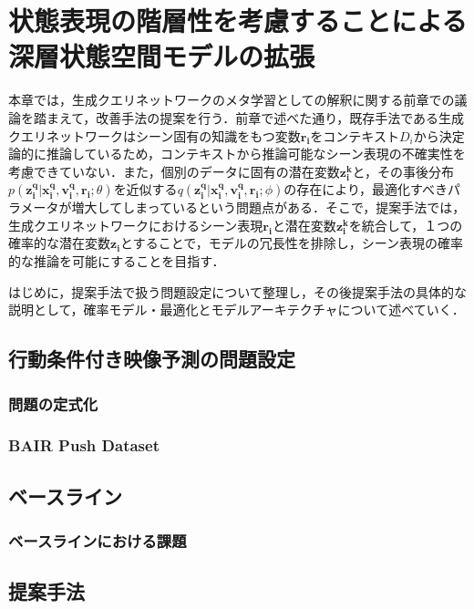 \chapter{状態表現の階層性を考慮することによる深層状態空間モデルの拡張}
\label{chap:proposal}
本章では，生成クエリネットワークのメタ学習としての解釈に関する前章での議論を踏まえて，改善手法の提案を行う．前章で述べた通り，既存手法である生成クエリネットワークはシーン固有の知識をもつ変数$\bm{r_i}$をコンテキスト$D_i$から決定論的に推論しているため，コンテキストから推論可能なシーン表現の不確実性を考慮できていない．また，個別のデータに固有の潜在変数$\bm{z_i^k}$と，その事後分布$p(\bm{z_i^q}|\bm{x_i^q}, \bm{v_i^q}, \bm{r_i}; \theta)$を近似する$q(\bm{z_i^q}|\bm{x_i^q}, \bm{v_i^q}, \bm{r_i}; \phi)$の存在により，最適化すべきパラメータが増大してしまっているという問題点がある．そこで，提案手法では，生成クエリネットワークにおけるシーン表現$\bm{r_i}$と潜在変数$\bm{z_i^k}$を統合して，１つの確率的な潜在変数$\bm{z_i}$とすることで，モデルの冗長性を排除し，シーン表現の確率的な推論を可能にすることを目指す．

はじめに，提案手法で扱う問題設定について整理し，その後提案手法の具体的な説明として，確率モデル・最適化とモデルアーキテクチャについて述べていく．

\section{行動条件付き映像予測の問題設定}
\subsection{問題の定式化}
\subsection{BAIR Push Dataset}
\section{ベースライン}
\subsection{ベースラインにおける課題}
\section{提案手法}
